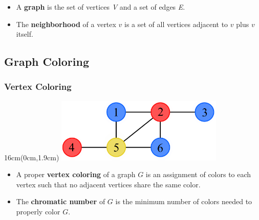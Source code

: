 \documentclass[xcolor=dvipsnames,aspectratio=1610]{beamer}
\newcommand{\exampleheight}{1.9cm}
\newcommand{\examplewidth}{16cm}
\begin{document}
\begin{frame}
    \vspace{4cm}

    \vfill

    \begin{itemize}
      \item<1-4> A \textbf{graph} is the set of vertices \emph{V} and a set of edges \emph{E}.
      \item<2-4> The \textbf{neighborhood} of a vertex $v$ is a set of all vertices adjacent to $v$ plus $v$ itself.
    \end{itemize}

  \end{frame}

  \subsection{Graph Coloring}

  \begin{frame}
    \frametitle{Vertex Coloring}

    \begin{textblock*}{\examplewidth}(0cm,\exampleheight) %
      \centering
      \includegraphics[width=8cm]{../figures/example-vcp.pdf}
    \end{textblock*}

    \vspace{4cm}

    \vfill


    \begin{itemize}
      \item A proper \textbf{vertex coloring} of a graph $G$ is an assignment of colors to each vertex such that no adjacent vertices share the same color.
      \item The \textbf{chromatic number} of $G$ is the minimum number of colors needed to properly color $G$.
    \end{itemize}
  \end{frame}
\end{document}
